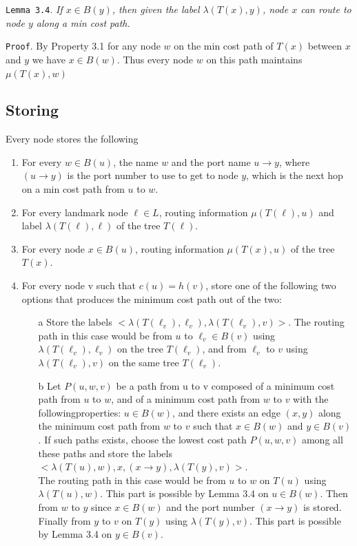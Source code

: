\texttt{Lemma 3.4}. \textit{If $x\in B(y)$, then given the label $\lambda(T(x),y)$, node $x$ can route to node $y$ along a min cost path.}

\texttt{Proof}. By Property 3.1 for any node $w$ on the min cost path of $T(x)$ between $x$ and $y$ we have $x\in B(w)$. Thus every node $w$ on this path maintains $\mu(T(x),w)$

\subsection{Storing}
Every node stores the following
\begin{enumerate}
    \item\label{it:item1} For every $w\in B(u)$, the name $w$ and the port name $u\rightarrow y$, where $(u\rightarrow y)$ is the port number to use to get to node $y$, which is the next hop on a min cost path from $u$ to $w$.
    \item\label{it:item2} For every landmark node $\ell \in L$, routing information $\mu(T(\ell),u)$ and label $\lambda(T(\ell),\ell)$ of the tree $T(\ell)$.
    \item\label{it:item3} For every node $x\in B(u)$, routing information $\mu(T(x),u)$ of the tree $T(x)$.
    \item\label{it:item4} For every node v such that $c(u) = h(v)$, store one of the following two options that produces the minimum cost path out of the two:
    \begin{enumerate}
        \item[a] Store the labels $<\lambda(T (\ell_v), \ell_v ), \lambda(T (\ell_v), v)>$. The routing path in this case would be from $u$ to $\ell_v \in B(v)$ using $\lambda(T (\ell_v), \ell_v)$ on the tree $T (\ell_v)$, and from $\ell_v$ to $v$ using $\lambda(T (\ell_v), v)$ on the same tree $T (\ell_v)$.

        \item[b] Let $P(u, w, v)$ be a path from u to v composed of a minimum cost path from $u$ to $w$, and of a minimum cost path from $w$ to $v$ with the followingproperties: $u \in B(w)$, and there exists an edge $(x, y)$ along the minimum cost path from $w$ to $v$ such that $x \in B(w)$ and $y \in B(v)$. If such paths exists, choose the lowest cost path $P(u, w, v)$ among all these paths and store the labels $<\lambda(T (u), w), x, (x \rightarrow y), \lambda(T (y), v)>$.\\
        The routing path in this case would be from $u$ to $w$ on $T(u)$ using $\lambda(T (u), w)$. This part is possible by Lemma 3.4 on $u \in B(w)$. Then from $w$ to $y$ since $x \in B(w)$ and the port number $(x \rightarrow y)$ is stored. Finally from $y$ to $v$ on $T(y)$ using $\lambda(T (y), v)$. This part is possible by Lemma 3.4 on $y \in B(v)$.
    \end{enumerate}
\end{enumerate}

